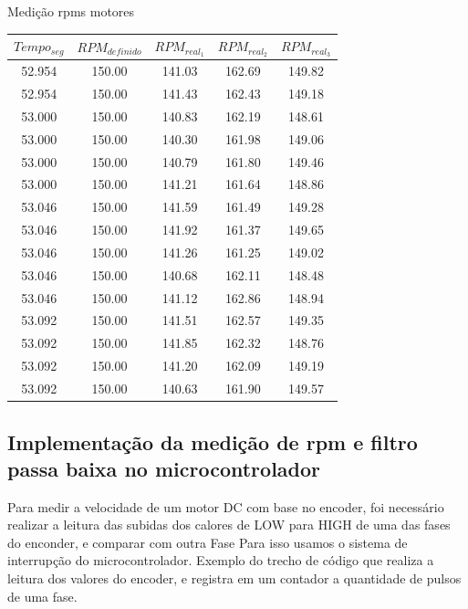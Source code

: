 \begin{quadro}[htb]
	\caption{\label{medicao_motores}Medição rpms motores}
	 \begin{tabular}{|c|c|c|c|c|}
		\hline
		\textbf{$Tempo_{seg}$} & \textbf{$RPM_{definido}$} & \textbf{$RPM_{real_{1}}$} & \textbf{$RPM_{real_{2}}$} & \textbf{$RPM_{real_{3}}$} \\ \hline
		52.954 & 150.00  & 141.03 & 162.69 & 149.82 \\ \hline
		52.954 & 150.00  & 141.43 & 162.43 & 149.18 \\ \hline
		53.000 & 150.00  & 140.83 & 162.19 & 148.61 \\ \hline
		53.000 & 150.00  & 140.30 & 161.98 & 149.06 \\ \hline
		53.000 & 150.00  & 140.79 & 161.80 & 149.46 \\ \hline
		53.000 & 150.00  & 141.21 & 161.64 & 148.86 \\ \hline
		53.046 & 150.00  & 141.59 & 161.49 & 149.28 \\ \hline
		53.046 & 150.00  & 141.92 & 161.37 & 149.65 \\ \hline
		53.046 & 150.00  & 141.26 & 161.25 & 149.02 \\ \hline
		53.046 & 150.00  & 140.68 & 162.11 & 148.48 \\ \hline
		53.046 & 150.00  & 141.12 & 162.86 & 148.94 \\ \hline
		53.092 & 150.00  & 141.51 & 162.57 & 149.35 \\ \hline
		53.092 & 150.00  & 141.85 & 162.32 & 148.76 \\ \hline
		53.092 & 150.00  & 141.20 & 162.09 & 149.19 \\ \hline
		53.092 & 150.00  & 140.63 & 161.90 & 149.57 \\ \hline
	\end{tabular}
\end{quadro}


\subsection{Implementação da medição de rpm e filtro passa baixa no microcontrolador}

Para medir a velocidade de um motor DC com base no encoder, foi necessário realizar a leitura das subidas dos calores de LOW para HIGH de uma das fases do enconder, e comparar com outra Fase
Para isso usamos o sistema de interrupção do microcontrolador.
Exemplo do trecho de código que realiza a leitura dos valores do encoder, e registra em um contador a quantidade de pulsos de uma fase.


